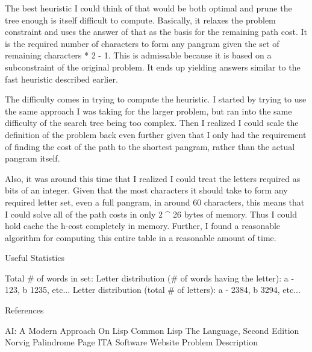 The best heuristic I could think of that would be both optimal and
prune the tree enough is itself difficult to compute. Basically, it
relaxes the problem constraint and uses the answer of that as the
basis for the remaining path cost. It is the required number of
characters to form any pangram given the set of remaining characters *
2 - 1. This is admissable because it is based on a subconstraint of
the original problem. It ends up yielding answers similar to the fast
heuristic described earlier.

The difficulty comes in trying to compute the heuristic. I started by
trying to use the same approach I was taking for the larger problem,
but ran into the same difficulty of the search tree being too
complex. Then I realized I could scale the definition of the problem
back even further given that I only had the requirement of finding the
cost of the path to the shortest pangram, rather than the actual
pangram itself.

Also, it was around this time that I realized I could treat the
letters required as bits of an integer. Given that the most characters
it should take to form any required letter set, even a full pangram,
in around 60 characters, this means that I could solve all of the path
costs in only 2 ^ 26 bytes of memory. Thus I could hold cache the
h-cost completely in memory. Further, I found a reasonable algorithm
for computing this entire table in a reasonable amount of time.


Useful Statistics

Total # of words in set:
Letter distribution (# of words having the letter): a - 123, b 1235, etc...
Letter distribution (total # of letters): a - 2384, b 3294, etc...



References

AI: A Modern Approach
On Lisp
Common Lisp The Language, Second Edition
Norvig Palindrome Page
ITA Software Website Problem Description
